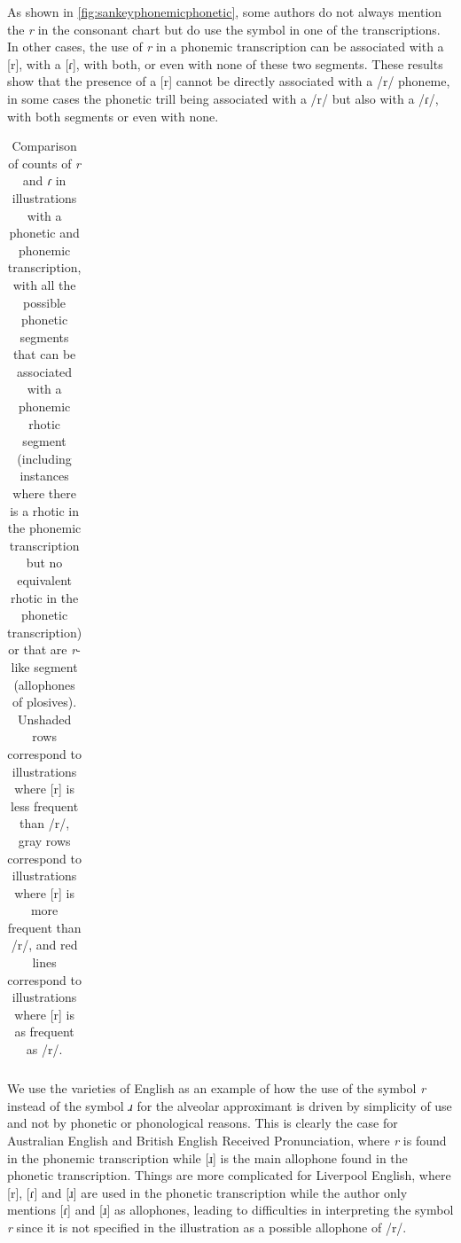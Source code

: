 As shown in \autoref{fig:sankeyphonemicphonetic}, some authors do not always mention the \textit{r} in the consonant chart but do use the symbol in one of the transcriptions. In other cases, the use of \textit{r} in a phonemic transcription can be associated with a [r], with a [ɾ], with both, or even with none of these two segments. These results show that the presence of a [r] cannot be directly associated with a /r/ phoneme, in some cases the phonetic trill being associated with a /r/ but also with a /ɾ/, with both segments or even with none.


\begin{landscape}
\begin{longtable}{>{\raggedright\arraybackslash}m{4.5cm}cccc>{\centering\arraybackslash}m{2.5cm}>{\raggedright\arraybackslash}m{8cm}}
	\caption[Comparison of counts of \textit{r} and \textit{ɾ} in illustrations with a phonetic and phonemic transcription]{Comparison of counts of \textit{r} and \textit{ɾ} in illustrations with a phonetic and phonemic transcription, with all the possible phonetic segments that can be associated with a phonemic rhotic segment (including instances where there is a rhotic in the phonemic transcription but no equivalent rhotic in the phonetic transcription) or that are \textit{r}-like segment (allophones of plosives). Unshaded rows correspond to illustrations where [r] is less frequent than /r/, gray rows correspond to illustrations where [r] is more frequent than /r/, and red lines correspond to illustrations where [r] is as frequent as /r/.}
	\label{tab:tablecompaphonophone}
\end{longtable}
\end{landscape}

\restoregeometry

We use the varieties of English as an example of how the use of the symbol \textit{r} instead of the symbol \textit{ɹ} for the alveolar approximant is driven by simplicity of use and not by phonetic or phonological reasons. This is clearly the case for Australian English and British English Received Pronunciation, where \textit{r} is found in the phonemic transcription while [ɹ] is the main allophone found in the phonetic transcription. Things are more complicated for Liverpool English, where [r], [ɾ] and [ɹ] are used in the phonetic transcription while the author only mentions [ɾ] and [ɹ] as allophones, leading to difficulties in interpreting the symbol \textit{r} since it is not specified in the illustration as a possible allophone of /r/. \\

